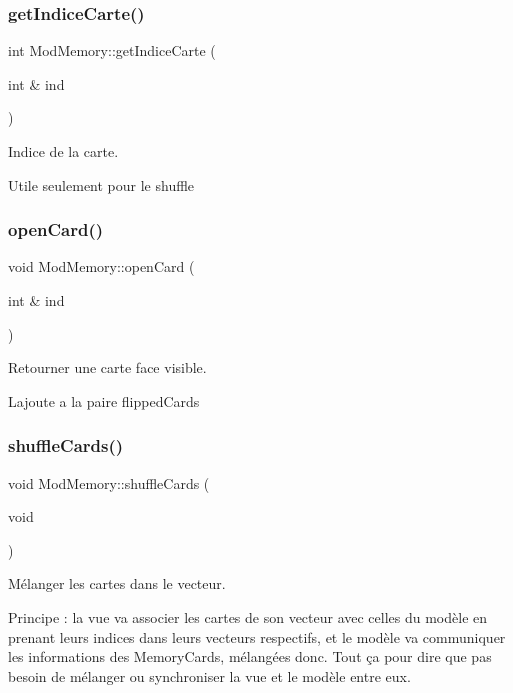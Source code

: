 \subsubsection{\texorpdfstring{get\+Indice\+Carte()}{getIndiceCarte()}}
{\footnotesize\ttfamily int Mod\+Memory\+::get\+Indice\+Carte (\begin{DoxyParamCaption}\item[{int \&}]{ind }\end{DoxyParamCaption})}



Indice de la carte. 

Utile seulement pour le shuffle \mbox{\label{class_mod_memory_a5886105416521e463eeaf732e8a0f6fe}} 
\subsubsection{\texorpdfstring{open\+Card()}{openCard()}}
{\footnotesize\ttfamily void Mod\+Memory\+::open\+Card (\begin{DoxyParamCaption}\item[{int \&}]{ind }\end{DoxyParamCaption})}



Retourner une carte face visible. 

L\textquotesingle{}ajoute a la paire flipped\+Cards \mbox{\label{class_mod_memory_ad85f5a28220e641195215e705a928fb1}} 
\subsubsection{\texorpdfstring{shuffle\+Cards()}{shuffleCards()}}
{\footnotesize\ttfamily void Mod\+Memory\+::shuffle\+Cards (\begin{DoxyParamCaption}\item[{void}]{ }\end{DoxyParamCaption})}



Mélanger les cartes dans le vecteur. 

Principe \+: la vue va associer les cartes de son vecteur avec celles du modèle en prenant leurs indices dans leurs vecteurs respectifs, et le modèle va communiquer les informations des Memory\+Cards, mélangées donc. Tout ça pour dire que pas besoin de mélanger ou synchroniser la vue et le modèle entre eux.

